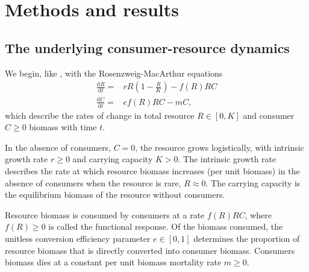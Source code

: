 \documentclass[11pt]{article}
\begin{document}
\section*{Methods and results}

\subsection*{The underlying consumer-resource dynamics}
We begin, like \cite{Gilbert2014}, with the Rosenzweig-MacArthur equations \citep{Rosenzweig1963}
\begin{equation}\label{eq:RM}
\begin{aligned}
\frac{\mathrm{d}R}{\mathrm{d}t} =& r R \left(1 - \frac{R}{K} \right) - f(R) R C\\
\frac{\mathrm{d}C}{\mathrm{d}t} =& e f(R) R C - m C,
\end{aligned}
\end{equation}
which describe the rates of change in total resource $R\in[0,K]$ and consumer $C\geq0$ biomass with time $t$.

In the absence of consumers, $C=0$, the resource grows logistically, with intrinsic growth rate $r\geq0$ and carrying capacity $K>0$.
The intrinsic growth rate describes the rate at which resource biomass increases (per unit biomass) in the absence of consumers when the resource is rare, $R\approx0$.
The carrying capacity is the equilibrium biomass of the resource without consumers.

Resource biomass is consumed by consumers at a rate $f(R) R C$, where $f(R)\geq0$ is called the functional response.
Of the biomass consumed, the unitless conversion efficiency parameter $e\in[0,1]$ determines the proportion of resource biomass that is directly converted into consumer biomass.
Consumers biomass dies at a constant per unit biomass mortality rate $m\geq0$.
\end{document}
